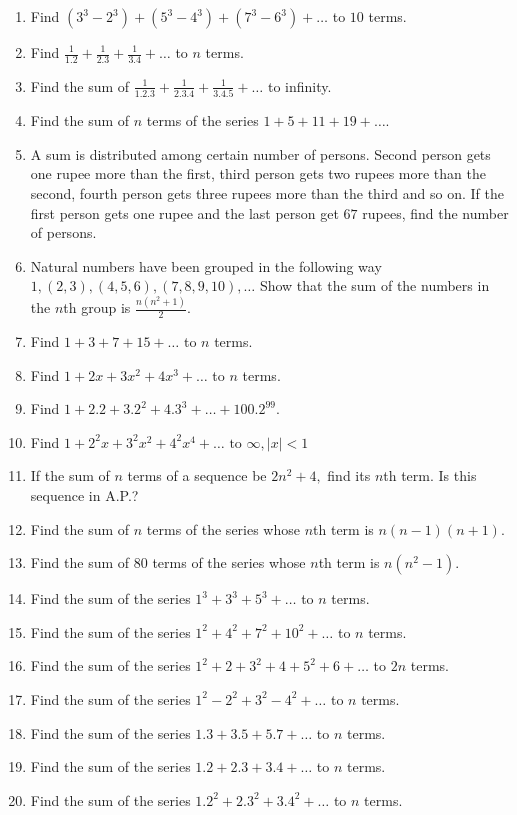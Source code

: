 \begin{enumerate}
\item Find $(3^3 - 2^3) + (5^3 - 4^3) + (7^3 - 6^3) + \ldots$ to $10$ terms.
\item Find $\frac{1}{1.2} + \frac{1}{2.3} + \frac{1}{3.4} + \ldots$ to $n$ terms.
\item Find the sum of $\frac{1}{1.2.3} + \frac{1}{2.3.4} + \frac{1}{3.4.5} + \ldots$ to infinity.
\item Find the sum of $n$ terms of the series $1 + 5 + 11 + 19 + \ldots$.
\item A sum is distributed among certain number of persons. Second person gets one rupee more than the first, third person
  gets two rupees more than the second, fourth person gets three rupees more than the third and so on. If the first person gets one
  rupee and the last person get $67$ rupees, find the number of persons.
\item Natural numbers have been grouped in the following way $1, (2, 3), (4, 5, 6), (7, 8, 9, 10), \ldots$ Show that the
  sum of the numbers in the $n$th group is $\frac{n(n^2 + 1)}{2}$.
\item Find $1 + 3 + 7 + 15 + \ldots$ to $n$ terms.
\item Find $1 + 2x + 3x^2 + 4x^3 + \ldots$ to $n$ terms.
\item Find $1 + 2.2 + 3.2^2 + 4.3^3 + \ldots + 100.2^{99}$.
\item Find $1 + 2^2x + 3^2x^2 + 4^2x^4 + \ldots \text{~to~}\infty, |x| < 1$
\item If the sum of $n$ terms of a sequence be $2n^2 + 4,$ find its $n$th term. Is this sequence in A.P.?
\item Find the sum of $n$ terms of the series whose $n$th term is $n(n - 1)(n + 1)$.
\item Find the sum of $80$ terms of the series whose $n$th term is $n(n^2 - 1)$.
\item Find the sum of the series $1^3 + 3^3 + 5^3 + \ldots$ to $n$ terms.
\item Find the sum of the series $1^2 + 4^2 + 7^2 + 10^2 + \ldots$ to $n$ terms.
\item Find the sum of the series $1^2 + 2 + 3^2 + 4 + 5^2 + 6 + \ldots$ to $2n$ terms.
\item Find the sum of the series $1^2 - 2^2 + 3^2 - 4^2 + \ldots$ to $n$ terms.
\item Find the sum of the series $1.3 + 3.5 + 5.7 + \ldots$ to $n$ terms.
\item Find the sum of the series $1.2 + 2.3 + 3.4 + \ldots$ to $n$ terms.
\item Find the sum of the series $1.2^2 + 2.3^2 + 3.4^2 + \ldots$ to $n$ terms.

\end{enumerate}
